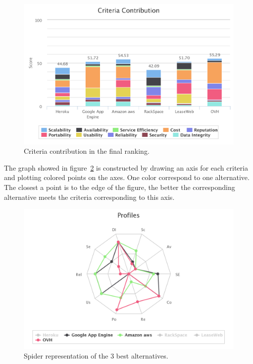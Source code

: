 \documentclass[a4paper,11pt]{article}
\begin{document}
\begin{figure}[h]
  \center
  \includegraphics[width=\textwidth-5cm]{img/Result/criteria_contribution.pdf}
  \caption{Criteria contribution in the final ranking.}
  \label{fig:contrib}
\end{figure}

The graph showed in figure~\ref{fig:spider} is constructed by drawing an axis for each criteria and plotting colored points on the axes. One color correspond to one alternative. The closest a point is to the edge of the figure, the better the corresponding alternative meets the criteria corresponding to this axis.\\

\begin{figure}
\centering
  \includegraphics[width=\textwidth-2cm]{img/Result/spider_web-3best.png}
\caption{\og Spider \fg{} representation of the 3 best alternatives.}
  \label{fig:spider}
\end{figure}
\end{document}
